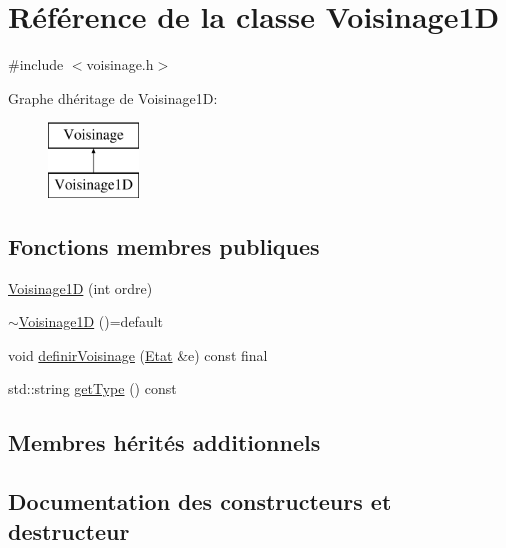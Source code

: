 \hypertarget{class_voisinage1_d}{}\section{Référence de la classe Voisinage1D}
\label{class_voisinage1_d}


{\ttfamily \#include $<$voisinage.\+h$>$}

Graphe d\textquotesingle{}héritage de Voisinage1D\+:\begin{figure}[H]
\begin{center}
\leavevmode
\includegraphics[height=2.000000cm]{class_voisinage1_d}
\end{center}
\end{figure}
\subsection*{Fonctions membres publiques}
\begin{DoxyCompactItemize}
\item 
\mbox{\hyperlink{class_voisinage1_d_a7077ba429224a21bc170dabcefea676e}{Voisinage1D}} (int ordre)
\item 
\mbox{\hyperlink{class_voisinage1_d_acb729fcae98b25a67d33098ef4a38260}{$\sim$\+Voisinage1D}} ()=default
\item 
void \mbox{\hyperlink{class_voisinage1_d_afdc267252af9b94fe26f5414d1472265}{definir\+Voisinage}} (\mbox{\hyperlink{class_etat}{Etat}} \&e) const final
\item 
std\+::string \mbox{\hyperlink{class_voisinage1_d_a92cc6dea76b6426d3cdaf849d18d205c}{get\+Type}} () const
\end{DoxyCompactItemize}
\subsection*{Membres hérités additionnels}


\subsection{Documentation des constructeurs et destructeur}
\mbox{\label{class_voisinage1_d_a7077ba429224a21bc170dabcefea676e}} 
